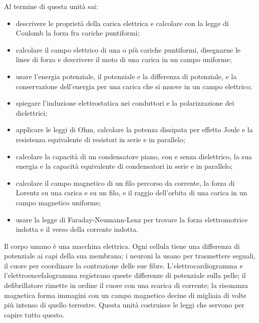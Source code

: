 \dispensa

\begin{tcolorbox}[fisbox={formula}{formulaBg},title={Obiettivi dell'unità}]
Al termine di questa unità sai:
\begin{itemize}
  \item descrivere le proprietà della carica elettrica e calcolare con la legge di Coulomb la forza fra cariche puntiformi;
  \item calcolare il campo elettrico di una o più cariche puntiformi, disegnarne le linee di forza e descrivere il moto di una carica in un campo uniforme;
  \item usare l'energia potenziale, il potenziale e la differenza di potenziale, e la conservazione dell'energia per una carica che si muove in un campo elettrico;
  \item spiegare l'induzione elettrostatica nei conduttori e la polarizzazione dei dielettrici;
  \item applicare le leggi di Ohm, calcolare la potenza dissipata per effetto Joule e la resistenza equivalente di resistori in serie e in parallelo;
  \item calcolare la capacità di un condensatore piano, con e senza dielettrico, la sua energia e la capacità equivalente di condensatori in serie e in parallelo;
  \item calcolare il campo magnetico di un filo percorso da corrente, la forza di Lorentz su una carica e su un filo, e il raggio dell'orbita di una carica in un campo magnetico uniforme;
  \item usare la legge di Faraday-Neumann-Lenz per trovare la forza elettromotrice indotta e il verso della corrente indotta.
\end{itemize}
\end{tcolorbox}

Il corpo umano è una macchina elettrica. Ogni cellula tiene una differenza di potenziale ai capi della sua membrana; i neuroni la usano per trasmettere segnali, il cuore per coordinare la contrazione delle sue fibre. L'elettrocardiogramma e l'elettroencefalogramma registrano queste differenze di potenziale sulla pelle; il defibrillatore rimette in ordine il cuore con una scarica di corrente; la risonanza magnetica forma immagini con un campo magnetico decine di migliaia di volte più intenso di quello terrestre. Questa unità costruisce le leggi che servono per capire tutto questo.

